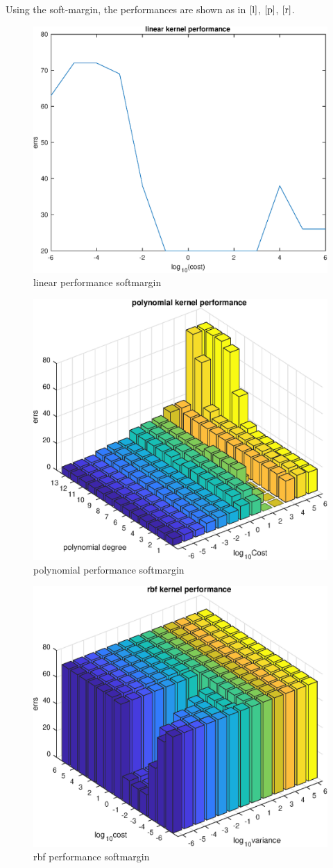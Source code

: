 \documentclass[a4paper,12pt]{article}
\begin{document}
Using the soft-margin, the performances are shown as in $\ref{l}$, $\ref{p}$, $\ref{r}$.
\begin{figure}
\centering
\includegraphics[width=.7\textwidth]{figure/linear_performance.eps}
\caption{linear performance softmargin}
\label{l}
\end{figure}
\begin{figure}
\centering
\includegraphics[width=.7\textwidth]{figure/polynomial_performance.eps}
\caption{polynomial performance softmargin}
\label{p}
\end{figure}
\begin{figure}
\centering
\includegraphics[width=.7\textwidth]{figure/rbf_performance.eps}
\caption{rbf performance softmargin}
\label{r}
\end{figure}
\end{document}

